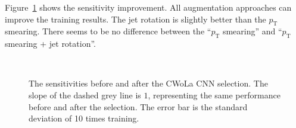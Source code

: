 \documentclass[12pt]{article}
\begin{document}
        Figure~\ref{fig:sensitivity_improvement_origin_pt_jet_aug_3} shows the sensitivity improvement. All augmentation approaches can improve the training results. The jet rotation is slightly better than the $p_{\text{T}}$ smearing. There seems to be no difference between the ``$p_{\text{T}}$ smearing'' and ``$p_{\text{T}}$ smearing + jet rotation''.
        \begin{figure}[htpb]
            \centering
             \\
            \caption{The sensitivities before and after the CWoLa CNN selection. The slope of the dashed grey line is $1$, representing the same performance before and after the selection. The error bar is the standard deviation of 10 times training.}
            \label{fig:sensitivity_improvement_origin_pt_jet_aug_3}
        \end{figure}
\end{document}

